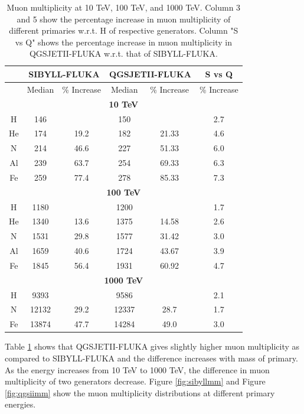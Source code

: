 \documentclass[12pt]{article}
\begin{document}
\begin{table}
\centering
\begin{tabular}{ | c | c | c | c | c | c |} 
\hline
& \multicolumn{2}{|c|}{\textbf{SIBYLL-FLUKA}} & \multicolumn{2}{|c|}{\textbf{QGSJETII-FLUKA}} & S vs Q \\
\hline
 & Median & \% Increase & Median & \% Increase & \% Increase \\
\hline 
\multicolumn{6}{|c|}{\textbf{10 TeV}} \\
\hline
H 	&	146	&	      & 150 &			& 2.7 \\
\hline
He 	&	174 &	19.2 &	182	&	21.33	&	4.6	\\
\hline
N 	& 	214 & 	46.6 &	227	&	51.33	&6.0	\\
\hline
Al 	& 	239 & 	63.7 &	254	&	69.33	&6.3	\\
\hline
Fe 	& 	259 & 	77.4 &	278	&	85.33	&7.3	\\
\hline
\multicolumn{6}{|c|}{\textbf{100 TeV}} \\
\hline
H & 1180 &  & 1200 & & 1.7 \\
\hline
He & 1340 & 13.6  & 1375 & 14.58	& 2.6\\
\hline
N & 1531 & 29.8 & 1577 & 31.42 	& 3.0\\
\hline
Al & 1659 & 40.6 & 1724 & 43.67 	& 3.9\\
\hline
Fe & 1845 & 56.4 & 1931 & 60.92	& 4.7\\
\hline
\multicolumn{6}{|c|}{\textbf{1000 TeV}} \\
\hline
H & 9393 &  & 9586 & & 2.1\\
\hline
N & 12132 & 29.2 & 12337 & 28.7 & 1.7\\
\hline
Fe & 13874 & 47.7 & 14284 & 49.0 & 3.0\\
\hline
\end{tabular}
\caption{Muon multiplicity at 10 TeV, 100 TeV, and 1000 TeV. Column 3 and 5 show the percentage increase in muon multiplicity of different primaries w.r.t. H of respective generators. Column "S vs Q" shows the percentage increase in muon multiplicity in QGSJETII-FLUKA w.r.t. that of SIBYLL-FLUKA.\label{tab:muon_multiplicity}}
\end{table}

Table \ref{tab:muon_multiplicity} shows that QGSJETII-FLUKA gives slightly higher muon multiplicity as compared to SIBYLL-FLUKA and the difference increases with mass of primary. As the energy increases from 10 TeV to 1000 TeV, the difference in muon multiplicity of two generators decrease. Figure \ref{fig:sibyllmm} and Figure \ref{fig:qgsiimm} show the muon multiplicity distributions  at different primary energies.
\end{document}
